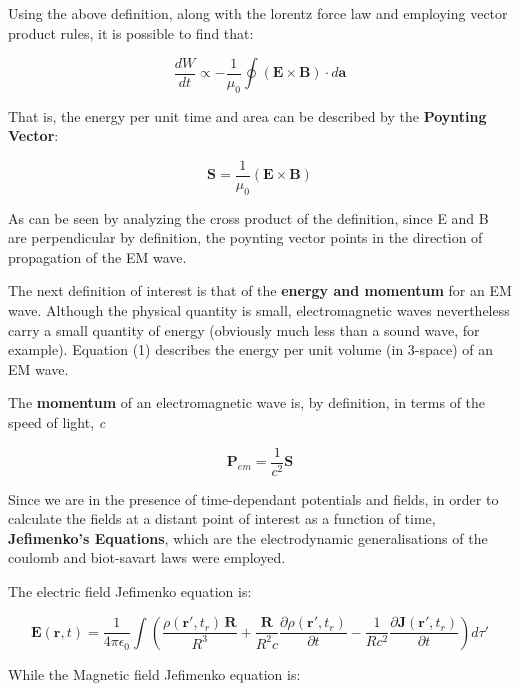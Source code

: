 \documentclass[twocolumn]{article}
\renewcommand{\vec}[1]{\boldsymbol{#1}}
\begin{document}
\noindent Using the above definition, along with the lorentz force law and employing vector product rules,
it is possible to find that:

\begin{equation}
\frac{dW}{dt} \propto - \frac{1}{\mu_{0}} \oint (\textbf{E} \times \textbf{B}) \cdot d\textbf{a}
\end{equation}

\noindent That is, the energy per unit time and area can be described by the \textbf{Poynting Vector}:

\begin{equation}
\vec{\textbf{S}} = \frac{1}{\mu_{0}}(\textbf{E} \times \textbf{B})
\end{equation}

\noindent As can be seen by analyzing the cross product of the definition, since E and B are perpendicular by definition, the poynting vector points 
in the direction of propagation of the EM wave.
\par
The next definition of interest is that of the \textbf{energy and momentum} for an EM wave. Although the physical quantity is small, electromagnetic 
waves nevertheless carry a small quantity of energy (obviously much less than a sound wave, for example). Equation (1) describes the energy per unit 
volume (in 3-space) of an EM wave. 

\noindent The \textbf{momentum} of an electromagnetic wave is, by definition, in terms of the speed of light, \textit{c}

\begin{equation}
\vec{\textbf{P}}_{em} = \frac{1}{c^{2}} \vec{\textbf{S}}
\end{equation}

\noindent Since we are in the presence of time-dependant potentials and fields, in order to calculate the fields at a distant point of interest as a 
function of time, \textbf{Jefimenko's Equations}, which are the electrodynamic generalisations of the coulomb and biot-savart laws were employed.
\par
The electric field Jefimenko equation is:

\tiny
\begin{equation}
 \vec{E}(\vec{r},t) = 
\frac{1}{4\pi\epsilon_0}\int\left(\frac{\rho(\vec{r'},t_r)\,\vec{R}}{R^3}+\frac{\vec{R}}{R^2c}\frac{\partial\rho(\vec{r'},t_r)}{\partial 
t} - 
\frac{1}{Rc^2}\frac{\partial \vec{J}(\vec{r'},t_r)}{\partial t}\right)d\tau'
\end{equation}
\normalsize
\par
While the Magnetic field Jefimenko equation is:
\end{document}
